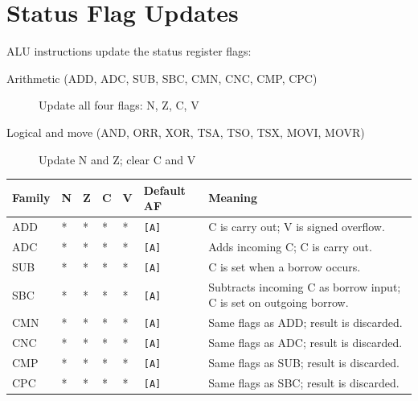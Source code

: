 \section{Status Flag Updates}

ALU instructions update the status register flags:

\begin{description}
	\item[Arithmetic (ADD, ADC, SUB, SBC, CMN, CNC, CMP, CPC)] Update all four flags: N, Z, C, V
	\item[Logical and move (AND, ORR, XOR, TSA, TSO, TSX, MOVI, MOVR)] Update N and Z; clear C and V
\end{description}

\begin{table}[H]
	\centering
	\begin{tabular}{llllllp{5.5cm}}
		\toprule
		\textbf{Family} & \textbf{N} & \textbf{Z} & \textbf{C} & \textbf{V} & \textbf{Default AF} & \textbf{Meaning}                                                   \\
		\midrule
		ADD             & *          & *          & *          & *          & \texttt{[A]}        & C is carry out; V is signed overflow.                              \\
		ADC             & *          & *          & *          & *          & \texttt{[A]}        & Adds incoming C; C is carry out.                                   \\
		SUB             & *          & *          & *          & *          & \texttt{[A]}        & C is set when a borrow occurs.                                     \\
		SBC             & *          & *          & *          & *          & \texttt{[A]}        & Subtracts incoming C as borrow input; C is set on outgoing borrow. \\
		CMN             & *          & *          & *          & *          & \texttt{[A]}        & Same flags as ADD; result is discarded.                            \\
		CNC             & *          & *          & *          & *          & \texttt{[A]}        & Same flags as ADC; result is discarded.                            \\
		CMP             & *          & *          & *          & *          & \texttt{[A]}        & Same flags as SUB; result is discarded.                            \\
		CPC             & *          & *          & *          & *          & \texttt{[A]}        & Same flags as SBC; result is discarded.                            \\

\end{tabular}
\end{table}
